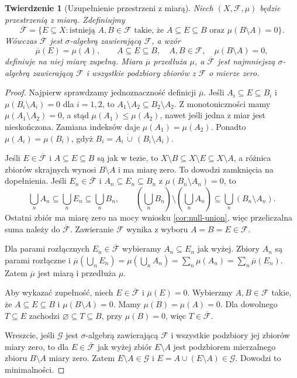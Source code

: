 \documentclass[11pt,a4paper,oneside]{book}
\numberwithin{equation}{chapter}
\theoremstyle{plain}
\newtheorem{twierdzenie}{Twierdzenie}[chapter]
\theoremstyle{definition}
\theoremstyle{remark}
\begin{document}
\begin{twierdzenie}[Uzupełnienie przestrzeni z miarą]
\label{thm:completion}
Niech $(X,\mathcal F,\mu)$ będzie przestrzenią z miarą.
Zdefiniujmy
\[
\overline{\mathcal F}
=\{E\subseteq X:\text{istnieją }A,B\in\mathcal F
\text{ takie, że }A\subseteq E\subseteq B
\text{ oraz }\mu(B\setminus A)=0\}.
\]
Wówczas $\overline{\mathcal F}$ jest $\sigma$-algebrą zawierającą
$\mathcal F$, a wzór
\[
\overline\mu(E)=\mu(A),\qquad
A\subseteq E\subseteq B,\quad A,B\in\mathcal F,
\quad\mu(B\setminus A)=0,
\]
definiuje na niej miarę zupełną. Miara $\overline\mu$
przedłuża $\mu$, a $\overline{\mathcal F}$ jest najmniejszą
$\sigma$-algebrą zawierającą $\mathcal F$ i wszystkie
podzbiory zbiorów z $\mathcal F$ o mierze zero.
\end{twierdzenie}
\begin{proof}
Najpierw sprawdzamy jednoznaczność definicji $\overline\mu$.
Jeśli $A_i\subseteq E\subseteq B_i$ i
$\mu(B_i\setminus A_i)=0$ dla $i=1,2$, to
$A_1\setminus A_2\subseteq B_2\setminus A_2$.
Z monotoniczności mamy $\mu(A_1\setminus A_2)=0$,
a stąd $\mu(A_1)\leq\mu(A_2)$, nawet jeśli
jedna z miar jest nieskończona. Zamiana indeksów
daje $\mu(A_1)=\mu(A_2)$. Ponadto
$\mu(A_i)=\mu(B_i)$, gdyż
$B_i=A_i\,\dot\cup\,(B_i\setminus A_i)$.

Jeśli $E\in\overline{\mathcal F}$ i
$A\subseteq E\subseteq B$ są jak w tezie, to
$X\setminus B\subseteq X\setminus E\subseteq X\setminus A$,
a różnica zbiorów skrajnych wynosi $B\setminus A$
i ma miarę zero. To dowodzi zamknięcia na dopełnienia.
Jeśli $E_n\in\overline{\mathcal F}$ i
$A_n\subseteq E_n\subseteq B_n$ z
$\mu(B_n\setminus A_n)=0$, to
\[
\bigcup_nA_n\subseteq\bigcup_nE_n\subseteq\bigcup_nB_n,
\qquad
\left(\bigcup_nB_n\right)\setminus\left(\bigcup_nA_n\right)
\subseteq\bigcup_n(B_n\setminus A_n).
\]
Ostatni zbiór ma miarę zero na mocy wniosku
\ref{cor:null-union}, więc przeliczalna suma należy do
$\overline{\mathcal F}$. Zawieranie $\mathcal F$ wynika
z wyboru $A=B=E\in\mathcal F$.

Dla parami rozłącznych $E_n\in\overline{\mathcal F}$
wybieramy $A_n\subseteq E_n$ jak wyżej. Zbiory $A_n$
są parami rozłączne i
$\overline\mu(\bigcup_nE_n)=\mu(\bigcup_nA_n)
=\sum_n\mu(A_n)=\sum_n\overline\mu(E_n)$.
Zatem $\overline\mu$ jest miarą i przedłuża $\mu$.

Aby wykazać zupełność, niech $E\in\overline{\mathcal F}$
i $\overline\mu(E)=0$. Wybierzmy $A,B\in\mathcal F$
takie, że $A\subseteq E\subseteq B$ i
$\mu(B\setminus A)=0$. Mamy $\mu(B)=\mu(A)=0$.
Dla dowolnego $T\subseteq E$ zachodzi
$\varnothing\subseteq T\subseteq B$, przy $\mu(B)=0$,
więc $T\in\overline{\mathcal F}$.

Wreszcie, jeśli $\mathcal G$ jest $\sigma$-algebrą zawierającą
$\mathcal F$ i wszystkie podzbiory jej zbiorów miary zero,
to dla $E\in\overline{\mathcal F}$ jak wyżej zbiór
$E\setminus A$ jest podzbiorem mierzalnego zbioru
$B\setminus A$ miary zero. Zatem $E\setminus A\in\mathcal G$
i $E=A\cup(E\setminus A)\in\mathcal G$. Dowodzi to minimalności.
\end{proof}
\end{document}
